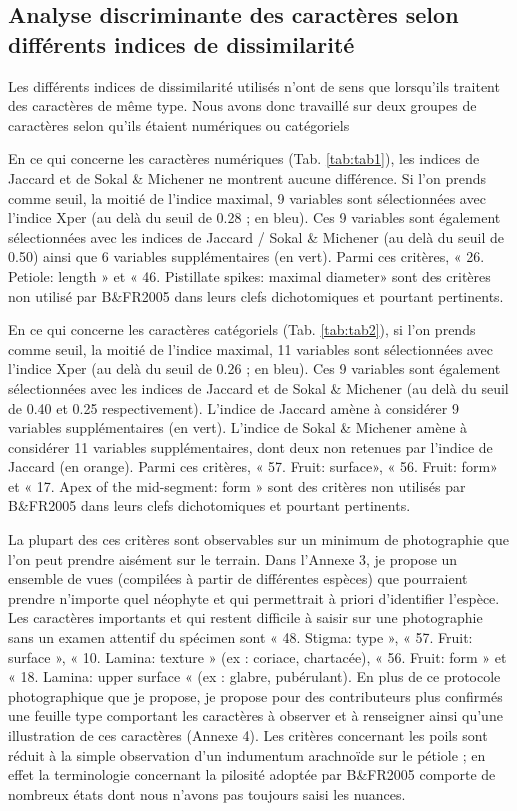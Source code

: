 \documentclass[a4paper]{article}
\theoremstyle{definition}
\theoremstyle{definition}
\theoremstyle{definition}
\theoremstyle{remark}
\begin{document}
\subsection{Analyse discriminante des caractères selon différents
indices de
dissimilarité}\label{analyse-discriminante-des-caracteres-selon-differents-indices-de-dissimilarite}

Les différents indices de dissimilarité utilisés n'ont de sens que
lorsqu'ils traitent des caractères de même type. Nous avons donc
travaillé sur deux groupes de caractères selon qu'ils étaient numériques
ou catégoriels

En ce qui concerne les caractères numériques (Tab. \ref{tab:tab1}), les
indices de Jaccard et de Sokal \& Michener ne montrent aucune
différence. Si l'on prends comme seuil, la moitié de l'indice maximal, 9
variables sont sélectionnées avec l'indice Xper (au delà du seuil de
0.28 ; en bleu). Ces 9 variables sont également sélectionnées avec les
indices de Jaccard / Sokal \& Michener (au delà du seuil de 0.50) ainsi
que 6 variables supplémentaires (en vert). Parmi ces critères, « 26.
Petiole: length » et « 46. Pistillate spikes: maximal diameter» sont des
critères non utilisé par B\&FR2005 dans leurs clefs dichotomiques et
pourtant pertinents.

En ce qui concerne les caractères catégoriels (Tab. \ref{tab:tab2}), si
l'on prends comme seuil, la moitié de l'indice maximal, 11 variables
sont sélectionnées avec l'indice Xper (au delà du seuil de 0.26 ; en
bleu). Ces 9 variables sont également sélectionnées avec les indices de
Jaccard et de Sokal \& Michener (au delà du seuil de 0.40 et 0.25
respectivement). L'indice de Jaccard amène à considérer 9 variables
supplémentaires (en vert). L'indice de Sokal \& Michener amène à
considérer 11 variables supplémentaires, dont deux non retenues par
l'indice de Jaccard (en orange). Parmi ces critères, « 57. Fruit:
surface», « 56. Fruit: form» et « 17. Apex of the mid-segment: form »
sont des critères non utilisés par B\&FR2005 dans leurs clefs
dichotomiques et pourtant pertinents.

La plupart des ces critères sont observables sur un minimum de
photographie que l'on peut prendre aisément sur le terrain. Dans
l'Annexe 3, je propose un ensemble de vues (compilées à partir de
différentes espèces) que pourraient prendre n'importe quel néophyte et
qui permettrait à priori d'identifier l'espèce. Les caractères
importants et qui restent difficile à saisir sur une photographie sans
un examen attentif du spécimen sont « 48. Stigma: type », « 57. Fruit:
surface », « 10. Lamina: texture » (ex : coriace, chartacée), « 56.
Fruit: form » et « 18. Lamina: upper surface « (ex : glabre,
pubérulant). En plus de ce protocole photographique que je propose, je
propose pour des contributeurs plus confirmés une feuille type
comportant les caractères à observer et à renseigner ainsi qu'une
illustration de ces caractères (Annexe 4). Les critères concernant les
poils sont réduit à la simple observation d'un indumentum arachnoïde sur
le pétiole ; en effet la terminologie concernant la pilosité adoptée par
B\&FR2005 comporte de nombreux états dont nous n'avons pas toujours
saisi les nuances.
\end{document}
